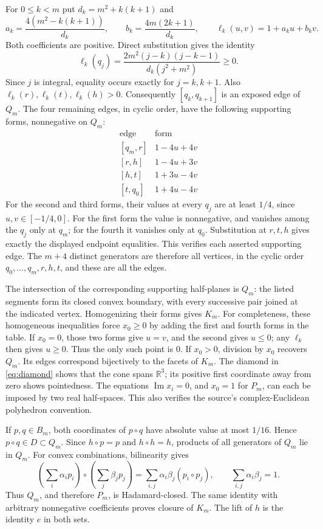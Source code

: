 \documentclass[11pt,a4paper]{article}
\newcommand{\R}{\mathbb R}
\begin{document}
For $0\leq k<m$ put $d_k=m^2+k(k+1)$ and
\[
 a_k=\frac{4(m^2-k(k+1))}{d_k},\qquad
 b_k=\frac{4m(2k+1)}{d_k},\qquad
 \ell_k(u,v)=1+a_k u+b_k v.
\]
Both coefficients are positive. Direct substitution gives the identity
\begin{equation}\label{eq:slack}
 \ell_k(q_j)=
 \frac{2m^2(j-k)(j-k-1)}{d_k(j^2+m^2)}\geq0.
\end{equation}
Since $j$ is integral, equality occurs exactly for $j=k,k+1$.
Also $\ell_k(r),\ell_k(t),\ell_k(h)>0$.
Consequently $[q_k,q_{k+1}]$ is an exposed edge of $Q_m$.
The four remaining edges, in cyclic order, have the following supporting
forms, nonnegative on $Q_m$:
\[
\begin{array}{c|c}
\text{edge}&\text{form}\\ \hline
{[q_m,r]}&1-4u+4v\\
{[r,h]}&1-4u+3v\\
{[h,t]}&1+3u-4v\\
{[t,q_0]}&1+4u-4v
\end{array}
\]
For the second and third forms, their values at every $q_j$ are at least
$1/4$, since $u,v\in[-1/4,0]$. For the first form the value is nonnegative,
and vanishes among the $q_j$ only at $q_m$; for the fourth it vanishes only
at $q_0$. Substitution at $r,t,h$ gives exactly the displayed endpoint
equalities. This verifies each asserted supporting edge.
The $m+4$ distinct generators are therefore all vertices, in the cyclic order
$q_0,\ldots,q_m,r,h,t$, and these are all the edges.

The intersection of the corresponding supporting half-planes is $Q_m$:
the listed segments form its closed convex boundary, with every successive
pair joined at the indicated vertex. Homogenizing their forms gives $K_m$.
For completeness, these homogeneous inequalities force $x_0\geq0$ by adding
the first and fourth forms in the table. If $x_0=0$, those two forms give
$u=v$, and the second gives $u\leq0$; any $\ell_k$ then gives $u\geq0$.
Thus the only such point is $0$. If $x_0>0$, division by $x_0$ recovers
$Q_m$. Its edges correspond bijectively to the facets of $K_m$.
The diamond in \eqref{eq:diamond} shows that the cone spans $\R^3$;
its positive first coordinate away from zero shows pointedness.
The equations $\operatorname{Im}x_i=0$, and $x_0=1$ for $P_m$, can each
be imposed by two real half-spaces. This also verifies the source's
complex-Euclidean polyhedron convention.

If $p,q\in B_m$, both coordinates of $p\circ q$ have absolute value
at most $1/16$. Hence $p\circ q\in D\subset Q_m$.
Since $h\circ p=p$ and $h\circ h=h$, products of all generators of
$Q_m$ lie in $Q_m$. For convex combinations, bilinearity gives
\[
 \left(\sum_i\alpha_i p_i\right)\circ
 \left(\sum_j\beta_j p_j\right)
   =\sum_{i,j}\alpha_i\beta_j(p_i\circ p_j),
 \qquad \sum_{i,j}\alpha_i\beta_j=1.
\]
Thus $Q_m$, and therefore $P_m$, is Hadamard-closed. The same identity
with arbitrary nonnegative coefficients proves closure of $K_m$.
The lift of $h$ is the identity $e$ in both sets.
\end{document}
